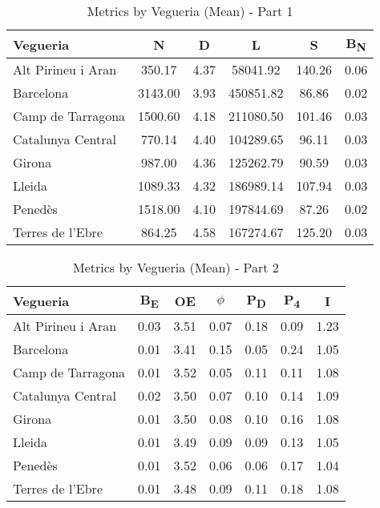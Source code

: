 \begin{table}[h!]
\centering
\begin{tabular}{lccccc}
\hline
Vegueria & \textbf{N} & \textbf{D} & \textbf{L} & \textbf{S} & \textbf{B\textsubscript{N}} \\
\hline
Alt Pirineu i Aran & 350.17 & 4.37 & 58041.92 & 140.26 & 0.06 \\
Barcelona & 3143.00 & 3.93 & 450851.82 & 86.86 & 0.02 \\
Camp de Tarragona & 1500.60 & 4.18 & 211080.50 & 101.46 & 0.03 \\
Catalunya Central & 770.14 & 4.40 & 104289.65 & 96.11 & 0.03 \\
Girona & 987.00 & 4.36 & 125262.79 & 90.59 & 0.03 \\
Lleida & 1089.33 & 4.32 & 186989.14 & 107.94 & 0.03 \\
Penedès & 1518.00 & 4.10 & 197844.69 & 87.26 & 0.02 \\
Terres de l'Ebre & 864.25 & 4.58 & 167274.67 & 125.20 & 0.03 \\
\hline
\end{tabular}
\caption {Metrics by Vegueria (Mean) - Part 1}
\end{table}

\begin{table}[h!]
\centering
\begin{tabular}{lcccccc}
\hline
Vegueria & \textbf{B\textsubscript{E}} & \textbf{OE} & \textbf{$\phi$} & \textbf{P\textsubscript{D}} & \textbf{P\textsubscript{4}} & \textbf{I} \\
\hline
Alt Pirineu i Aran & 0.03 & 3.51 & 0.07 & 0.18 & 0.09 & 1.23 \\
Barcelona & 0.01 & 3.41 & 0.15 & 0.05 & 0.24 & 1.05 \\
Camp de Tarragona & 0.01 & 3.52 & 0.05 & 0.11 & 0.11 & 1.08 \\
Catalunya Central & 0.02 & 3.50 & 0.07 & 0.10 & 0.14 & 1.09 \\
Girona & 0.01 & 3.50 & 0.08 & 0.10 & 0.16 & 1.08 \\
Lleida & 0.01 & 3.49 & 0.09 & 0.09 & 0.13 & 1.05 \\
Penedès & 0.01 & 3.52 & 0.06 & 0.06 & 0.17 & 1.04 \\
Terres de l'Ebre & 0.01 & 3.48 & 0.09 & 0.11 & 0.18 & 1.08 \\
\hline
\end{tabular}
\caption {Metrics by Vegueria (Mean) - Part 2}
\end{table}

